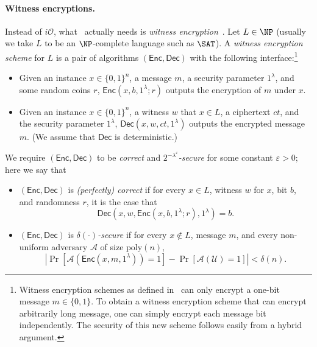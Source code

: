 \documentclass[10pt,a4paper]{article}
\theoremstyle{definition}
\theoremstyle{remark}
\renewcommand{\poly}{\mathrm{poly}}
\newcommand{\eps}{\varepsilon}
\newcommand{\Enc}{\mathsf{Enc}}
\newcommand{\Dec}{\mathsf{Dec}}
\newcommand{\calA}{\mathcal{A}}
\newcommand{\calU}{\mathcal{U}}
\newcommand{\iO}{i\mathcal{O}}
\let\mleft\left\let\mright\right
\begin{document}
\paragraph{Witness encryptions.} Instead of $\iO$, what~\cite{DBLP:conf/stoc/IlangoLW23} actually needs is \emph{witness encryption}~\cite{GargGSW13}. Let $L\in \NP$ (usually we take $L$ to be an $\NP$-complete language such as $\SAT$). A \emph{witness encryption scheme} for $L$ is a pair of algorithms $(\Enc, \Dec)$ with the following interface:\footnote{Witness encryption schemes as defined in~\cite{GargGSW13} can only encrypt a one-bit message $m\in \{0, 1\}$. To obtain a witness encryption scheme that can encrypt arbitrarily long message, one can simply encrypt each message bit independently. The security of this new scheme follows easily from a hybrid argument.}
\begin{itemize}
	\item Given an instance $x \in \{0, 1\}^n$, a message $m$, a security parameter $1^\lambda$, and some random coins $r$, $\Enc(x, b, 1^\lambda; r)$ outputs the encryption of $m$ under $x$.
	\item Given an instance $x \in \{0, 1\}^n$, a witness $w$ that $x\in L$, a ciphertext $ct$, and the security parameter $1^\lambda$, $\Dec(x, w, ct, 1^\lambda)$ outputs the encrypted message $m$. (We assume that $\Dec$ is deterministic.)
\end{itemize}

We require $(\Enc, \Dec)$ to be \emph{correct} and \emph{$2^{-\lambda^\eps}$-secure} for some constant $\eps > 0$; here we say that
\begin{itemize}
    \item $(\Enc, \Dec)$ is \emph{(perfectly) correct} if for every $x\in L$, witness $w$ for $x$, bit $b$, and randomness $r$, it is the case that 
    \[\Dec(x, w, \Enc(x, b, 1^\lambda; r), 1^\lambda) = b.\]
    \item $(\Enc, \Dec)$ is \emph{$\delta(\cdot)$-secure} if for every $x\not\in L$, message $m$, and every non-uniform adversary $\calA$ of size $\poly(n)$,
    \[\mleft|\Pr[\calA(\Enc(x, m, 1^\lambda)) = 1] - \Pr[\calA(\calU) = 1]\mright| < \delta(n).\]
\end{itemize}
\end{document}
